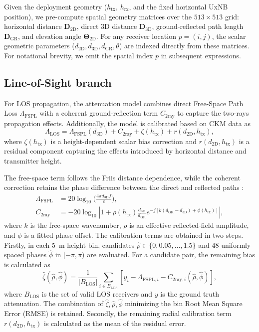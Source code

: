 \documentclass[10pt,conference,letterpaper]{IEEEtran}
\begin{document}
Given the deployment geometry ($h_{\text{tx}}$, $h_{\text{rx}}$, and the fixed horizontal UxNB position), we pre-compute spatial geometry matrices over the $513 \times 513$ grid: horizontal distance $\mathbf{D}_{\text{2D}}$, direct 3D distance $\mathbf{D}_{\text{3D}}$, ground-reflected path length $\mathbf{D}_{\text{GR}}$, and elevation angle $\mathbf{\Theta}_{\text{2D}}$. For any receiver location $p = (i, j)$, the scalar geometric parameters ($d_{\text{2D}}, d_{\text{3D}}, d_{\text{GR}}, \theta$) are indexed directly from these matrices. For notational brevity, we omit the spatial index $p$ in subsequent expressions.

\subsection{Line-of-Sight branch}
\label{sec:los}
For LOS propagation, the attenuation model combines direct Free-Space Path Loss $\Lambda_\text{FSPL}$ with a coherent ground-reflection term $C_{\text{2ray}}$ to capture the two-rays propagation effects. Additionally, the model is calibrated based on CKM data as
\begin{equation}
\Lambda_{\text{LOS}} = \Lambda_\text{FSPL}(d_{\text{3D}}) + C_{\text{2ray}} + \zeta(h_{\text{tx}}) + r(d_{\text{2D}},h_{\text{tx}}),
\label{eq:pl_los}
\end{equation}
where $\zeta(h_{\text{tx}})$ is a height-dependent scalar bias correction and $r(d_{\text{2D}},h_{\text{tx}})$ is a residual component capturing the effects introduced by horizontal distance and transmitter height.

The free-space term follows the Friis distance dependence, while the coherent
correction retains the phase difference between the direct and reflected paths
\cite{rappaport}:
\begin{align}
\Lambda_\text{FSPL}&=20\log_{10}\Big(\frac{4\pi d_\text{3D} f}{c}\Big),\label{eq:fspl}\\
C_{\mathrm{2ray}}&=-20\log_{10}\left|1+\rho(h_{\mathrm{tx}})
\frac{d_{\mathrm{3D}}}{d_{\mathrm{GR}}}
e^{-j[k(d_{\mathrm{GR}}-d_{\mathrm{3D}})+\phi(h_{\mathrm{tx}})]}\right|,
\label{eq:tworay}
\end{align}
where $k$ is the free-space wavenumber, $\rho$ is an effective reflected-field amplitude, and $\phi$ is a fitted phase offset. The calibration terms are obtained in two steps.
Firstly, in each \SI{5}{m} height bin, candidates $\hat\rho\in\{0,0.05,\ldots,1.5\}$ and 48 uniformly spaced phases $\hat{\phi}$ in $[-\pi,\pi)$ are evaluated. For a candidate pair, the remaining bias is calculated as
\begin{equation}
\hat\zeta(\hat\rho,\hat\phi)=\frac{1}{|B_\text{LOS}|}\sum_{i\in B_\text{LOS}}
\left[y_i-\Lambda_{\text{FSPL},i}-C_{\mathrm{2ray},i}(\hat\rho,\hat\phi)\right],
\label{eq:los-fit}
\end{equation}
where $B_\text{LOS}$ is the set of valid LOS receivers and $y$ is the ground truth attenuation. The combination of $\hat\zeta,\hat\rho,\hat\phi$ minimizing the bin Root Mean Square Error (RMSE) is retained.
Secondly, the remaining radial calibration term $r(d_{\text{2D}},h_\text{tx})$ is calculated as the mean of the residual error.
\end{document}
